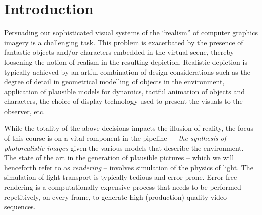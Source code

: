 \documentclass[11pt,fleqn]{book} %
\begin{document}



{}
\tableofcontents %

\cleardoublepage %




\chapter{Introduction}
Persuading our sophisticated visual systems of the ``realism'' of computer graphics imagery is a challenging task. 
This problem is exacerbated by the presence of fantastic objects and/or characters embedded in the virtual scene, thereby loosening the notion of realism in the resulting depiction. 
Realistic depiction is typically achieved by an artful combination of design considerations such as the degree of detail in geometrical modelling of objects in the environment, application of plausible models for dynamics, tactful animation of objects and characters, the choice of display technology used to present the visuals to the observer, etc. 

While the totality of the above decisions impacts the illusion of reality, the focus of this course is on a vital component in the pipeline --- \textit{the synthesis of photorealistic images} given the various models that describe the environment. The state of the art in the generation of plausible pictures -- which we will henceforth refer to as \textit{rendering} --  involves simulation of the physics of light. 
The simulation of light transport is typically tedious and error-prone.
Error-free rendering is a computationally expensive process that needs to be performed repetitively, on every frame, to generate high (production) quality video sequences. 
\end{document}
